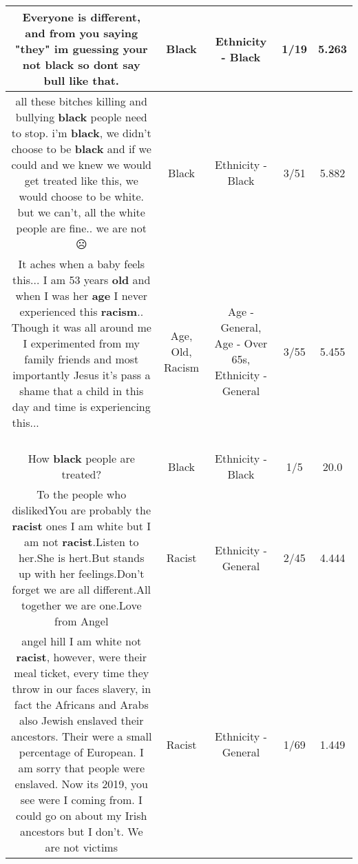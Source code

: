 \documentclass[11pt]{article}
\newlength\mylength
\begin{document}
\begin{center}
\begin{longtable}{|C{.65\mylength}|C{.30\mylength}|C{.12\mylength}|C{.12\mylength}|C{.12\mylength}|}
  \small Everyone is different, and from you saying "they" im guessing your not \textbf{black} so dont say bull like that.\normalsize   & Black & Ethnicity - Black & 1/19 & 5.263 \\  \hline
  \small all these bitches killing and bullying \textbf{black} people need to stop. i'm \textbf{black}, we didn't choose to be \textbf{black} and if we could and we knew we would get treated like this, we would choose to be white. but we can't, all the white people are fine.. we are not ☹\normalsize   & Black & Ethnicity - Black & 3/51 & 5.882 \\  \hline
  \small It aches when a baby feels this... I am 53 years \textbf{old} and when I was her \textbf{age} I never experienced this \textbf{racism}.. Though it was all around me I experimented from my family friends and most importantly  Jesus it's pass a shame that a child in this day and time is experiencing  this... 🙁🙁🙁🙁🙁🙁🙁🙁🙁🙁🙁🙁🙁🙁🙁🙁🙁🙁🙁🙁🙁🙁🙁🙁🙁🙁🙁🙁🙁🙁🙁🙁🙁🙁🙁🙁🙁🙁🙁🙁🙁🙁🙁🙁🙁🙁🙁🙁🙁🙁🙁🙁🙁🙁🙁🙁🙁🙁\normalsize   & Age, Old, Racism & Age - General, Age - Over 65s, Ethnicity - General & 3/55 & 5.455 \\  \hline
  \small How \textbf{black} people are treated?\normalsize   & Black & Ethnicity - Black & 1/5 & 20.0 \\  \hline
  \small To the people who dislikedYou are probably the \textbf{racist} ones I am white but I am not \textbf{racist}.Listen to her.She is hert.But stands up with her feelings.Don't forget we are all different.All together we are one.Love from Angel\normalsize   & Racist & Ethnicity - General & 2/45 & 4.444 \\  \hline
  \small angel hill I am white not \textbf{racist}, however, were their meal ticket, every time they throw in our faces slavery, in fact the Africans and Arabs also Jewish enslaved their ancestors. Their were a small percentage of European.  I am sorry that people were enslaved. Now its 2019, you see were I coming from.  I could go on about my Irish ancestors but I don't.  We are not victims\normalsize   & Racist & Ethnicity - General & 1/69 & 1.449 \\  \hline

\end{longtable}
\end{center}
\end{document}
